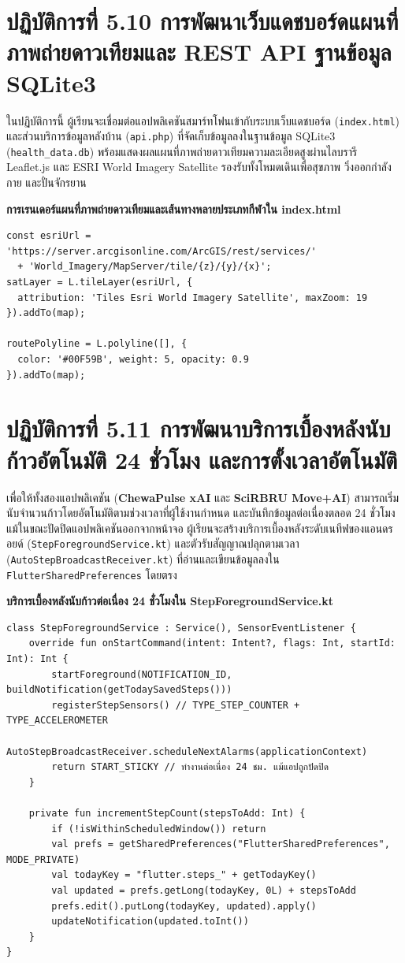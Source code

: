 \section{ปฏิบัติการที่ 5.10 การพัฒนาเว็บแดชบอร์ดแผนที่ภาพถ่ายดาวเทียมและ REST API ฐานข้อมูล SQLite3}
ในปฏิบัติการนี้ ผู้เรียนจะเชื่อมต่อแอปพลิเคชันสมาร์ทโฟนเข้ากับระบบเว็บแดชบอร์ด (\texttt{index.html}) และส่วนบริการข้อมูลหลังบ้าน (\texttt{api.php}) ที่จัดเก็บข้อมูลลงในฐานข้อมูล SQLite3 (\texttt{health\_data.db}) พร้อมแสดงผลแผนที่ภาพถ่ายดาวเทียมความละเอียดสูงผ่านไลบรารี Leaflet.js และ ESRI World Imagery Satellite รองรับทั้งโหมดเดินเพื่อสุขภาพ วิ่งออกกำลังกาย และปั่นจักรยาน

\begin{codebox}
\textbf{การเรนเดอร์แผนที่ภาพถ่ายดาวเทียมและเส้นทางหลายประเภทกีฬาใน index.html}
\begin{lstlisting}
const esriUrl = 'https://server.arcgisonline.com/ArcGIS/rest/services/'
  + 'World_Imagery/MapServer/tile/{z}/{y}/{x}';
satLayer = L.tileLayer(esriUrl, {
  attribution: 'Tiles Esri World Imagery Satellite', maxZoom: 19
}).addTo(map);

routePolyline = L.polyline([], {
  color: '#00F59B', weight: 5, opacity: 0.9
}).addTo(map);
\end{lstlisting}
\end{codebox}

\section{ปฏิบัติการที่ 5.11 การพัฒนาบริการเบื้องหลังนับก้าวอัตโนมัติ 24 ชั่วโมง และการตั้งเวลาอัตโนมัติ}
เพื่อให้ทั้งสองแอปพลิเคชัน (\textbf{ChewaPulse xAI} และ \textbf{SciRBRU Move+AI}) สามารถเริ่มนับจำนวนก้าวโดยอัตโนมัติตามช่วงเวลาที่ผู้ใช้งานกำหนด และบันทึกข้อมูลต่อเนื่องตลอด 24 ชั่วโมงแม้ในขณะปัดปิดแอปพลิเคชันออกจากหน้าจอ ผู้เรียนจะสร้างบริการเบื้องหลังระดับเนทีฟของแอนดรอยด์ (\texttt{StepForegroundService.kt}) และตัวรับสัญญาณปลุกตามเวลา (\texttt{AutoStepBroadcastReceiver.kt}) ที่อ่านและเขียนข้อมูลลงใน \texttt{FlutterSharedPreferences} โดยตรง

\begin{codebox}
\textbf{บริการเบื้องหลังนับก้าวต่อเนื่อง 24 ชั่วโมงใน StepForegroundService.kt}
\begin{lstlisting}
class StepForegroundService : Service(), SensorEventListener {
    override fun onStartCommand(intent: Intent?, flags: Int, startId: Int): Int {
        startForeground(NOTIFICATION_ID, buildNotification(getTodaySavedSteps()))
        registerStepSensors() // TYPE_STEP_COUNTER + TYPE_ACCELEROMETER
        AutoStepBroadcastReceiver.scheduleNextAlarms(applicationContext)
        return START_STICKY // ทำงานต่อเนื่อง 24 ชม. แม้แอปถูกปัดปิด
    }

    private fun incrementStepCount(stepsToAdd: Int) {
        if (!isWithinScheduledWindow()) return
        val prefs = getSharedPreferences("FlutterSharedPreferences", MODE_PRIVATE)
        val todayKey = "flutter.steps_" + getTodayKey()
        val updated = prefs.getLong(todayKey, 0L) + stepsToAdd
        prefs.edit().putLong(todayKey, updated).apply()
        updateNotification(updated.toInt())
    }
}
\end{lstlisting}
\end{codebox}

